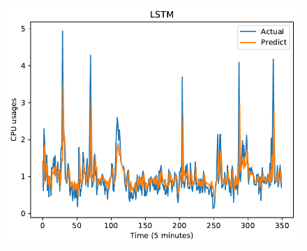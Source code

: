 \documentclass[11pt,twoside]{article}
\begin{document}
\begin{multicols}{2}
\begin{figure}[!ht]
\begin{minipage}[b]{0.33\linewidth}
    \includegraphics[width=0.9\linewidth]{predict/k2/cpu_k2_lstm.pdf} 
  \end{minipage} 
  

\end{figure}
\end{multicols}
\end{document}
